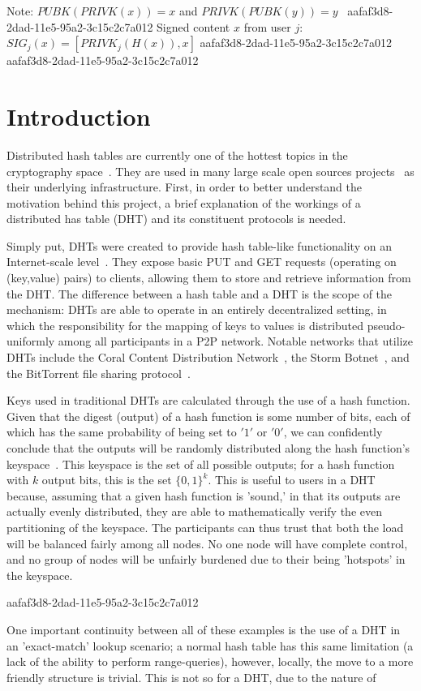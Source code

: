 \documentclass[12pt]{article}
\begin{document}
Note: $PUBK(PRIVK(x)) = x$ and $PRIVK(PUBK(y)) = y$~
aafaf3d8-2dad-11e5-95a2-3c15c2c7a012
Signed content $x$ from user $j$: $SIG_j(x) = \left[ PRIVK_j( H(x) ), x \right]$
aafaf3d8-2dad-11e5-95a2-3c15c2c7a012
aafaf3d8-2dad-11e5-95a2-3c15c2c7a012\section{Introduction}
\par Distributed hash tables are currently one of the hottest topics in the cryptography space~\cite{Stoica:2001dj,Rowstron:2001ea,Ratnasamy:2001wn}. They are used in many large scale open sources projects~\cite{Freitas:2013tb,Xu:2010vs,Perfitt:2010fh} as their underlying infrastructure. First, in order to better understand the motivation behind this project, a brief explanation of the workings of a distributed has table (DHT) and its constituent protocols is needed.

\par Simply put, DHTs were created to provide hash table-like functionality on an Internet-scale level~\cite{Ratnasamy:2001wn}. They expose basic PUT and GET requests (operating on (key,value) pairs) to clients, allowing them to store and retrieve information from the DHT. The difference between a hash table and a DHT is the scope of the mechanism: DHTs are able to operate in an entirely decentralized setting, in which the responsibility for the mapping of keys to values is distributed pseudo-uniformly among all participants in a P2P network. Notable networks that utilize DHTs include the Coral Content Distribution Network~\cite{Freedman:2004vb}, the Storm Botnet~\cite{Holz:2008uk}, and the BitTorrent file sharing protocol~\cite{Cohen:y1_8mBnw}.

\par Keys used in traditional DHTs are calculated through the use of a hash function. Given that the digest (output) of a hash function is some number of bits, each of which has the same probability of being set to $'1'$ or $'0'$, we can confidently conclude that the outputs will be randomly distributed along the hash function's keyspace~. This keyspace is the set of all possible outputs; for a hash function with $k$ output bits, this is the set $\{0,1\}^k$. This is useful to users in a DHT because, assuming that a given hash function is 'sound,' in that its outputs are actually evenly distributed, they are able to mathematically verify the even partitioning of the keyspace. The participants can thus trust that both the load will be balanced fairly among all nodes. No one node will have complete control, and no group of nodes will be unfairly burdened due to their being 'hotspots' in the keyspace.~

aafaf3d8-2dad-11e5-95a2-3c15c2c7a012\par One important continuity between all of these examples is the use of a DHT in an 'exact-match' lookup scenario; a normal hash table has this same limitation (a lack of the ability to perform range-queries), however, locally, the move to a more friendly structure is trivial. This is not so for a DHT, due to the nature of
\printbibliography
\end{document}
